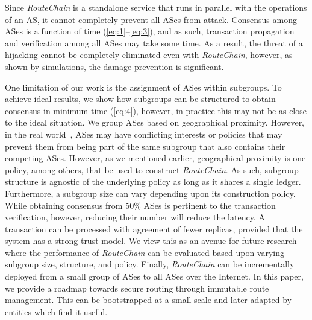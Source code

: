 \documentclass[conference]{IEEEtran}
\newcommand{\rc}{{{\em RouteChain}}\xspace}
\begin{document}
Since \rc is a standalone service that runs in parallel with the operations of an AS, it cannot completely prevent all ASes from attack. Consensus among ASes is a function of time (\autoref{eq:1}--\autoref{eq:3}), and as such, transaction propagation and verification among all ASes may take some time. As a result, the threat of a hijacking cannot be completely eliminated even with \rc, however, as shown by simulations, the damage prevention is significant.

One limitation of our work is the assignment of ASes within subgroups. To achieve ideal results, we show how subgroups can be structured to obtain consensus in minimum time (\autoref{eq:4}), however, in practice this may not be as close to the ideal situation. We group ASes based on geographical proximity. However, in the real world~\cite{LiangBXH11}, ASes may have conflicting interests or policies that may prevent them from being part of the same subgroup that also contains their competing ASes. However, as we mentioned earlier, geographical proximity is one policy, among others, that be used to construct \rc. As such, subgroup structure is agnostic of the underlying policy as long as it shares a single ledger. Furthermore, a subgroup size can vary depending upon its construction policy. While obtaining consensus from 50\% ASes is pertinent to the transaction verification, however, reducing their number will reduce the latency. A transaction can be processed with agreement of fewer replicas, provided that the system has a strong trust model. We view this as an avenue for future research where the performance of \rc can be evaluated based upon varying subgroup size, structure, and policy. Finally, \rc can be incrementally deployed from a small group of ASes to all ASes over the Internet. In this paper, we provide a roadmap towards secure routing through immutable route management. This can be bootstrapped at a small scale and later adapted by entities which find it useful. 
\end{document}
